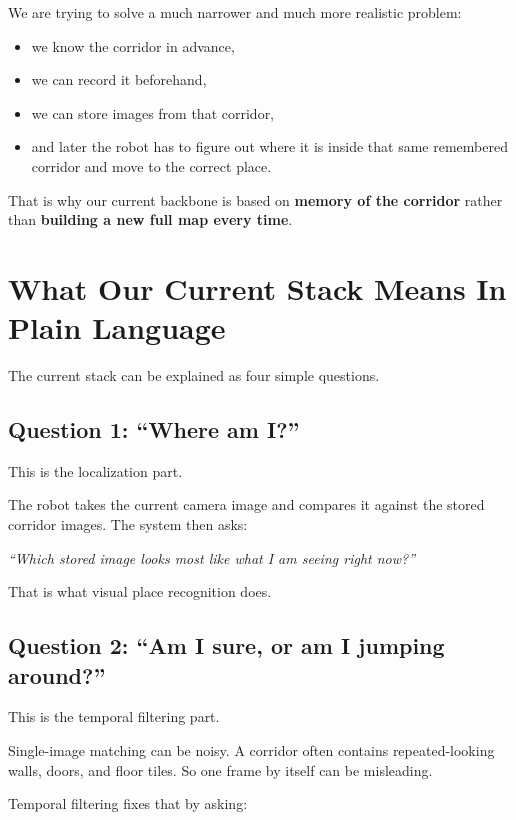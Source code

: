 \documentclass[11pt,a4paper]{article}
\begin{document}
We are trying to solve a much narrower and much more realistic problem:

\begin{itemize}[nosep]
  \item we know the corridor in advance,
  \item we can record it beforehand,
  \item we can store images from that corridor,
  \item and later the robot has to figure out where it is inside that same
  remembered corridor and move to the correct place.
\end{itemize}

That is why our current backbone is based on \textbf{memory of the corridor}
rather than \textbf{building a new full map every time}.

\section{What Our Current Stack Means In Plain Language}

The current stack can be explained as four simple questions.

\subsection{Question 1: ``Where am I?''}

This is the localization part.

The robot takes the current camera image and compares it against the stored
corridor images.  The system then asks:

\begin{center}
\textit{``Which stored image looks most like what I am seeing right now?''}
\end{center}

That is what visual place recognition does.

\subsection{Question 2: ``Am I sure, or am I jumping around?''}

This is the temporal filtering part.

Single-image matching can be noisy.  A corridor often contains repeated-looking
walls, doors, and floor tiles.  So one frame by itself can be misleading.

Temporal filtering fixes that by asking:
\end{document}
